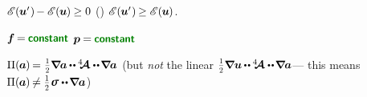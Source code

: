 \vspace{-0.2em}\noindent
{}
${
   {\mathscr{E}\hspace{-0.2ex}} \hspace{.16ex}
   (\hspace{-0.1ex} \bm{u}' \hspace{.1ex}) \hspace{-0.2ex}
   - {\mathscr{E}\hspace{-0.2ex}} \hspace{.16ex}
   (\hspace{-0.1ex} \bm{u} \hspace{-0.1ex}) \hspace{-0.1ex}
   \geq 0
}$
()
${
   {\mathscr{E}\hspace{-0.2ex}} \hspace{.16ex}
   (\hspace{-0.1ex}\bm{u}'\hspace{.1ex})
   \hspace{-0.2ex} \geq
   {\mathscr{E}\hspace{-0.2ex}} \hspace{.16ex}
   (\hspace{-0.1ex}\bm{u}\hspace{-0.1ex})
}$.

${ \bm{f} \hspace{-0.2ex} = \hspace{-0.1ex} \boldconstant }$
${ \bm{p} \hspace{-0.1ex} = \hspace{-0.1ex} \boldconstant }$

${\potentialenergydensity (\hspace{-0.1ex}\bm{a}\hspace{-0.1ex}) \hspace{-0.2ex} = \hspace{.1ex} \smallerdisplaystyleonehalf \boldnabla \hspace{-0.1ex} \bm{a} \hspace{-0.1ex} \dotdotp \hspace{-0.1ex} \stiffnesstensor \dotdotp \hspace{-0.25ex} \boldnabla \hspace{-0.1ex} \bm{a}}$
(but \emph{not} the linear ${\smallerdisplaystyleonehalf \boldnabla \bm{u} \hspace{-0.1ex} \dotdotp \hspace{-0.1ex} \stiffnesstensor \dotdotp \hspace{-0.25ex} \boldnabla \hspace{-0.1ex} \bm{a}}$\:--- this means ${\potentialenergydensity (\hspace{-0.1ex}\bm{a}\hspace{-0.1ex}) \hspace{-0.2ex} \neq \smallerdisplaystyleonehalf \hspace{.1ex} \linearstress \dotdotp \hspace{-0.25ex} \boldnabla \hspace{-0.1ex} \bm{a}}$)

